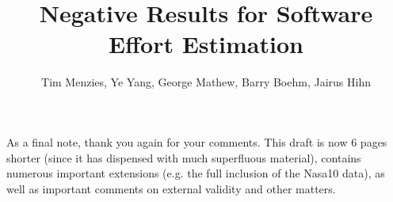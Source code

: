 \documentclass[smallcondesed]{svjour3}
\begin{document}
As a final note, thank you again for your comments. This draft is now 6 pages shorter (since it has dispensed
with much superfluous material), contains numerous important extensions (e.g. the full inclusion of the Nasa10 data),
as well as important comments on external validity and other matters.
\newpage
\date{}
%


\title{Negative Results for Software Effort Estimation}


%
%
%
%
%

\author{Tim Menzies, Ye Yang, George Mathew,  Barry Boehm, Jairus Hihn
}
\end{document}

